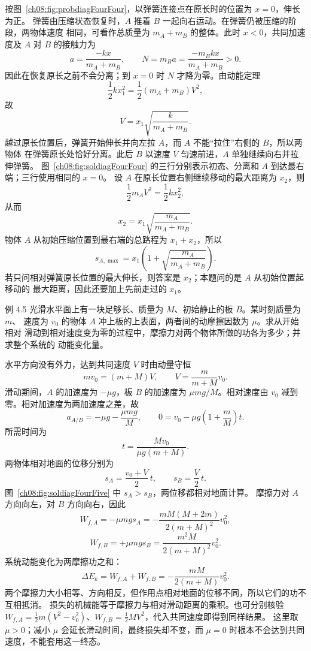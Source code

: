 \begin{xesolution}
按图~\ref{ch08:fig:probdiagFourFour}，以弹簧连接点在原长时的位置为 $x=0$，伸长为正。
弹簧由压缩状态恢复时，$A$ 推着 $B$ 一起向右运动。在弹簧仍被压缩的阶段，两物体速度
相同，可看作总质量为 $m_A+m_B$ 的整体。此时 $x<0$，共同加速度及 $A$ 对 $B$ 的接触力为
\[
 a=\frac{-kx}{m_A+m_B},\qquad N=m_Ba=\frac{-m_Bkx}{m_A+m_B}>0.
\]
因此在恢复原长之前不会分离；到 $x=0$ 时 $N$ 才降为零。由动能定理
\[
 \frac12kx_1^2
 =\frac12(m_A+m_B)V^2,
\]
故
\[
 V=x_1\sqrt{\frac{k}{m_A+m_B}}.
\]
越过原长位置后，弹簧开始伸长并向左拉 $A$，而 $A$ 不能“拉住”右侧的 $B$，所以两物体
在弹簧原长处恰好分离。此后 $B$ 以速度 $V$ 匀速前进，$A$ 单独继续向右并拉伸弹簧。
\soldiagFourFour
图~\ref{ch08:fig:soldiagFourFour} 的三行分别表示初态、分离和 $A$ 到达最右端；三行使用相同的 $x=0$。
设 $A$ 在原长位置右侧继续移动的最大距离为 $x_2$，则
\[
 \frac12m_AV^2=\frac12kx_2^2,
\]
从而
\[
 x_2=x_1\sqrt{\frac{m_A}{m_A+m_B}}.
\]
物体 $A$ 从初始压缩位置到最右端的总路程为 $x_1+x_2$，所以
\[
 \boxed{
 s_{A,\max}=x_1\left(1+\sqrt{\frac{m_A}{m_A+m_B}}\right)}.
\]
若只问相对弹簧原长位置的最大伸长，则答案是 $x_2$；本题问的是 $A$ 从初始位置起移动的
最大距离，因此还要加上先前走过的 $x_1$。
\end{xesolution}

\Needspace{0.28\textheight}
\begin{origexamplebox}{例 4.5}
光滑水平面上有一块足够长、质量为 $M$、初始静止的板 $B$。某时刻质量为 $m$、
速度为 $v_0$ 的物体 $A$ 冲上板的上表面，两者间的动摩擦因数为 $\mu$。求从开始相对
滑动到相对速度变为零的过程中，摩擦力对两个物体所做的功各为多少；并求整个系统的
动能变化量。
\end{origexamplebox}

\begin{xesolution}
水平方向没有外力，达到共同速度 $V$ 时由动量守恒
\[
 mv_0=(m+M)V,
 \qquad
 V=\frac{m}{m+M}v_0.
\]
滑动期间，$A$ 的加速度为 $-\mu g$，板 $B$ 的加速度为 $\mu mg/M$。相对速度由
$v_0$ 减到零。相对加速度为两加速度之差，故
\[
 a_{A/B}=-\mu g-\frac{\mu mg}{M},\qquad
 0=v_0-\mu g\left(1+\frac mM\right)t.
\]
所需时间为
\[
 t=\frac{Mv_0}{\mu g(m+M)}.
\]
两物体相对地面的位移分别为
\[
 s_A=\frac{v_0+V}{2}\,t,
 \qquad
 s_B=\frac{V}{2}\,t.
\]
\soldiagFourFive
图~\ref{ch08:fig:soldiagFourFive} 中 $s_A>s_B$，两位移都相对地面计算。
摩擦力对 $A$ 方向向左，对 $B$ 方向向右，因此
\[
 \boxed{
 W_{f,A}=-\mu mgs_A
 =-\frac{mM(M+2m)}{2(m+M)^2}v_0^2},
\]
\[
 \boxed{
 W_{f,B}=+\mu mgs_B
 =\frac{m^2M}{2(m+M)^2}v_0^2}.
\]
系统动能变化为两摩擦功之和：
\[
 \boxed{
 \Delta E_k=W_{f,A}+W_{f,B}
 =-\frac{mM}{2(m+M)}v_0^2}.
\]
两个摩擦力大小相等、方向相反，但作用点相对地面的位移不同，所以它们的功不互相抵消。
损失的机械能等于摩擦力与相对滑动距离的乘积。也可分别核验
$W_{f,A}=\tfrac12m(V^2-v_0^2)$、$W_{f,B}=\tfrac12MV^2$，代入共同速度即得到同样结果。
这里取 $\mu>0$；减小 $\mu$ 会延长滑动时间，最终损失却不变，而 $\mu=0$ 时根本不会达到共同速度，不能套用这一终态。
\end{xesolution}

